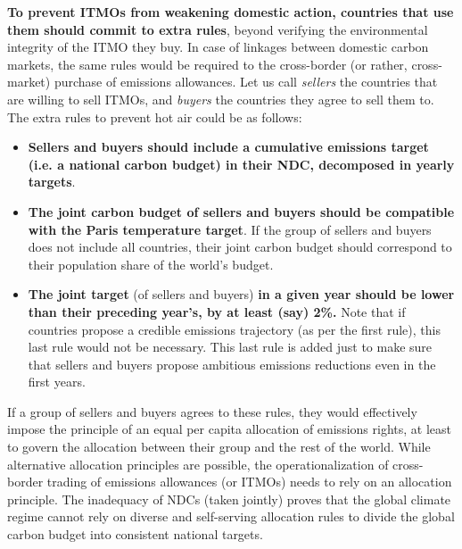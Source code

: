 \documentclass[12pt,english]{article}
\begin{document}
\textbf{To prevent ITMOs from weakening domestic action, countries that use them should commit to extra rules}, beyond verifying the environmental integrity of the ITMO they buy. In case of linkages between domestic carbon markets, the same rules would be required to the cross-border (or rather, cross-market) purchase of emissions allowances. Let us call \textit{sellers} the countries that are willing to sell ITMOs, and \textit{buyers} the countries they agree to sell them to. The extra rules to prevent hot air could be as follows: 
\begin{itemize}
  \item \textbf{Sellers and buyers should include a cumulative emissions target (i.e. a national carbon budget) in their NDC, decomposed in yearly targets}.
  \item \textbf{The joint carbon budget of sellers and buyers should be compatible with the Paris temperature target}. If the group of sellers and buyers does not include all countries, their joint carbon budget should correspond to their population share of the world's budget.
  \item \textbf{The joint target} (of sellers and buyers) \textbf{in a given year should be lower than their preceding year's, %
  by at least (say) 2\%.} Note that if countries propose a credible emissions trajectory (as per the first rule), this last rule would not be necessary. This last rule is added just to make sure that sellers and buyers propose ambitious emissions reductions even in the first years. %
\end{itemize}


If a group of sellers and buyers agrees to these rules, they would effectively impose the principle of an equal per capita allocation of emissions rights, at least to govern the allocation between their group and the rest of the world. While alternative allocation principles are possible, the operationalization of cross-border trading of emissions allowances (or ITMOs) needs to rely on an allocation principle. The inadequacy of NDCs (taken jointly) proves that the global climate regime cannot rely on diverse and self-serving allocation rules to divide the global carbon budget into consistent national targets. 
\end{document}
